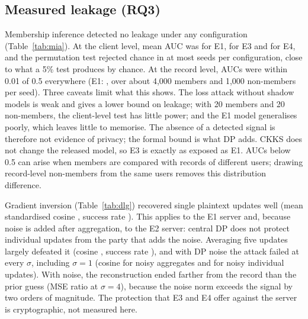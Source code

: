 \documentclass[11pt,a4paper]{article}
\begin{document}


\subsection{Measured leakage (RQ3)}

Membership inference detected no leakage under any configuration (Table~\ref{tab:mia}). At the client level, mean AUC was  for E1,  for E3 and  for E4, and the permutation test rejected chance in at most  seeds per configuration, close to what a 5\% test produces by chance. At the record level, AUCs were within 0.01 of 0.5 everywhere (E1: , over about 4,000 members and 1,000 non-members per seed). Three caveats limit what this shows. The loss attack without shadow models is weak and gives a lower bound on leakage; with 20 members and 20 non-members, the client-level test has little power; and the E1 model generalises poorly, which leaves little to memorise. The absence of a detected signal is therefore not evidence of privacy; the formal bound is what DP adds. CKKS does not change the released model, so E3 is exactly as exposed as E1. AUCs below 0.5 can arise when members are compared with records of different users; drawing record-level non-members from the same users removes this distribution difference.



Gradient inversion (Table~\ref{tab:dlg}) recovered single plaintext updates well (mean standardised cosine , success rate ). This applies to the E1 server and, because noise is added after aggregation, to the E2 server: central DP does not protect individual updates from the party that adds the noise. Averaging five updates largely defeated it (cosine , success rate ), and with DP noise the attack failed at every $\sigma$, including $\sigma=1$ (cosine  for noisy aggregates and  for noisy individual updates). With noise, the reconstruction ended farther from the record than the prior guess (MSE ratio  at $\sigma=4$), because the noise norm exceeds the signal by two orders of magnitude. The protection that E3 and E4 offer against the server is cryptographic, not measured here.


\end{document}
